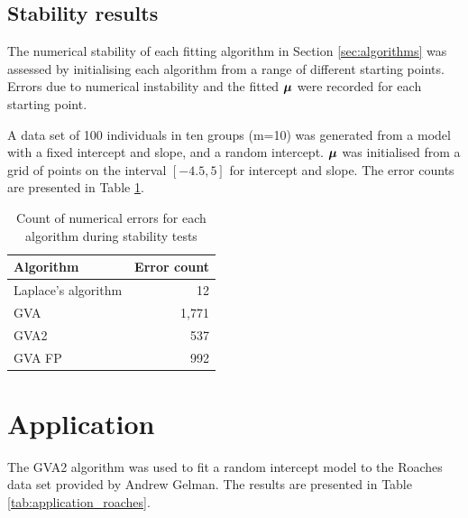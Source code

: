 \documentclass{article}[12pt]
\begin{document}

\subsection{Stability results}

The numerical stability of each fitting algorithm in Section \ref{sec:algorithms} was assessed by initialising
each algorithm from a range of different starting points. Errors due to numerical instability and the fitted
${\boldsymbol \mu}$ were recorded for each starting point.

A data set of 100 individuals in ten groups (m=10) was generated from a model with a fixed intercept
and slope, and a random intercept. ${\boldsymbol \mu}$ was initialised from a grid of points on the interval
$[-4.5, 5]$ for intercept and slope. The error counts are presented in Table
\ref{tab:stability_results}.

\begin{table}
\caption{Count of numerical errors for each algorithm during stability tests}
\label{tab:stability_results}
\begin{tabular}{|l|r|}
\hline
Algorithm & Error count \\
\hline
Laplace's algorithm & 12 \\
GVA & 1,771 \\
GVA2 & 537 \\
GVA FP & 992 \\
\hline
\end{tabular}
\end{table}

\section{Application}\label{sec:application}

The GVA2 algorithm was used to fit a random intercept model to the Roaches data set provided by Andrew Gelman.
The results are presented in Table \ref{tab:application_roaches}.

\end{document}
